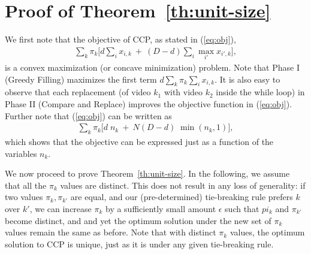 \documentclass[conference]{IEEEtran}
\begin{document}



\appendix

\section*{Proof of Theorem~\ref{th:unit-size}}
We first note that the objective of CCP, as stated in (\ref{eq:obj}), 
\begin{eqnarray}
\sum_k \pi_k  \bigg[ d \sum_i x_{i,k}  \ + \  (D-d)  \sum_i \max_{i'} x_{{i'},k} \bigg], \nonumber
\end{eqnarray}
is a convex maximization (or concave minimization) problem. Note that Phase I (Greedy Filling) maximizes the first term $d \sum_k \pi_k \sum_i x_{i,k}$. It is also easy to observe that each replacement (of video $k_1$ with video $k_2$ inside the while loop) in Phase II (Compare and Replace) improves the objective function in (\ref{eq:obj}). Further note that (\ref{eq:obj}) can be written as 
\begin{eqnarray}
\sum_k \pi_k  \bigg[ d\; n_k  \ + \  N (D-d)\; \min(n_k,1) \bigg], 
\label{eq:obj2}
\end{eqnarray}
which shows that the objective can be expressed just as a function of the variables $n_k$.

We now proceed to prove Theorem~\ref{th:unit-size}. In the following, we assume that all the $\pi_k$ values are distinct. This does not result in any loss of generality: if two values $\pi_k, \pi_{k'}$ are equal, and our (pre-determined) tie-breaking rule prefers $k$ over $k'$, we can increase $\pi_k$ by a sufficiently small amount $\epsilon$ such that $pi_k$ and $\pi_{k'}$ become distinct, and and yet the optimum solution under the new set of $\pi_k$ values remain the same as before. Note that with distinct $\pi_k$ values, the optimum solution to CCP is unique, just as it is under any given tie-breaking rule. 
\end{document}
